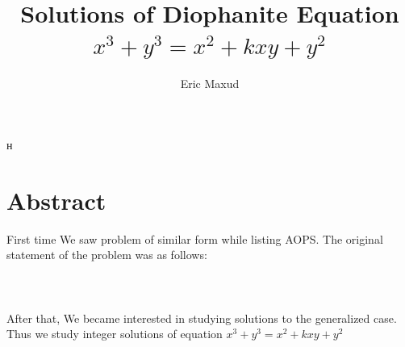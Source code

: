 н\documentclass[a4paper,14pt]{extarticle}  %
\title{Solutions of Diophanite Equation $x^3+y^3=x^2+kxy+y^2$}
\author{Eric Maxud}
\date{} %
\begin{document}
\maketitle

\section{Abstract}
First time We saw problem of similar form while listing AOPS. The original statement of the problem was as follows:
\\
\\
\noindent{}
\\
\\
After that, We became interested in studying solutions to the generalized case. Thus we study integer solutions of equation $x^3+y^3=x^2+kxy+y^2$
\end{document}
